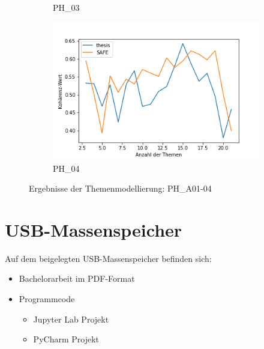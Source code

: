 \begin{figure}[!ht]
\begin{subfigure}[b]{0.495\textwidth}
         \caption{PH\_03}
         \label{fig:lda-a03}
     \end{subfigure}
     \hfill
     \begin{subfigure}[b]{0.495\textwidth}
         \centering
         \includegraphics[width=\textwidth]{media/cs_PH_A04.png}
         \caption{PH\_04}
         \label{fig:lda-a04}
     \end{subfigure}
    \caption{Ergebnisse der Themenmodellierung: PH\_A01-04}
    \label{app:figs:tmtopiccoherence-external}
\end{figure}

\section{USB-Massenspeicher}

\vspace{0.5cm}

Auf dem beigelegten USB-Massenspeicher befinden sich:

\begin{itemize}
    \item Bachelorarbeit im PDF-Format
    \item Programmcode
    \begin{itemize}
        \item Jupyter Lab Projekt
        \item PyCharm Projekt
    \end{itemize}
\end{itemize}
